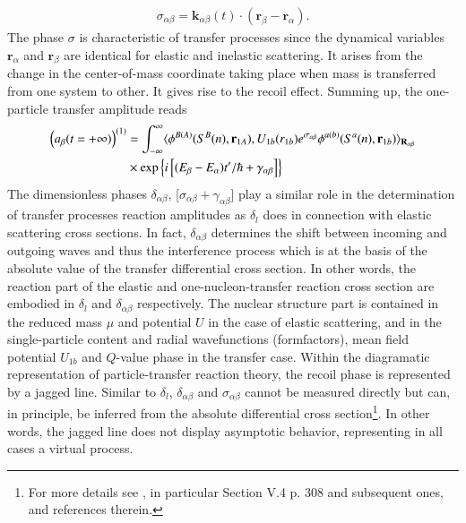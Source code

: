 \begin{subappendices}
\begin{align}
\sigma_{\alpha\beta}=\mathbf k_{\alpha\beta}(t)\cdot(\mathbf r_\beta-\mathbf r_\alpha).
\end{align} 
 The phase $\sigma$ is characteristic of transfer processes since the dynamical variables $\mathbf r_\alpha$ and $\mathbf r_\beta$ are identical for elastic and inelastic scattering. It arises from the change in the center-of-mass coordinate taking place when mass is transferred from one system to other. It gives rise to the recoil effect.  Summing up, the one-particle transfer amplitude reads
 \begin{align}\label{eq1.D.37}
\nonumber \left(a_\beta(t=+\infty)\right)^{(1)}&=\int_{-\infty}^{\infty}\langle {\phi^{B(A)}(S^B(n),\mathbf r_{1A}),U_{1b}(r_{1b})e^{\sigma_{\alpha\beta}}\phi^{a(b)}(S^a(n),\mathbf r_{1b})} \rangle_{\mathbf R_{\alpha\beta}}\\
&\times\exp\left\{i\left[(E_\beta-E_\alpha)t'/\hbar+\gamma_{\alpha\beta}\right]\right\}
 \end{align}
 The dimensionless phases $\delta_{\alpha\beta}$, [$\sigma_{\alpha\beta}+\gamma_{\alpha\beta}$] play a similar role in the determination of transfer processes reaction amplitudes as $\delta_l$ does in connection with elastic scattering cross sections. In fact, $\delta_{\alpha\beta}$ determines the shift between incoming and outgoing waves and thus the interference process which is at the basis of the absolute value of the transfer differential cross section. In other words, the reaction part of the elastic and one-nucleon-transfer reaction cross section are embodied in $\delta_l$ and $\delta_{\alpha\beta}$ respectively. The nuclear structure part is contained in the reduced mass $\mu$ and potential $U$ in the case of elastic scattering, and in the single-particle content and radial wavefunctions (formfactors), mean field potential $U_{1b}$ and $Q$-value phase in the transfer case. Within the diagramatic representation of particle-transfer reaction theory, the recoil phase is represented by a jagged line. Similar to $\delta_l$, $\delta_{\alpha\beta}$  and $\sigma_{\alpha\beta}$ cannot be measured directly but can, in principle,  be inferred from the absolute differential cross section\footnote{For more details see \cite{Broglia:04a}, in particular Section V.4 p. 308 and subsequent ones, and references therein.}. In other words, the jagged line does not display asymptotic behavior, representing in all cases a virtual process.  
 
 
 

\end{subappendices}
